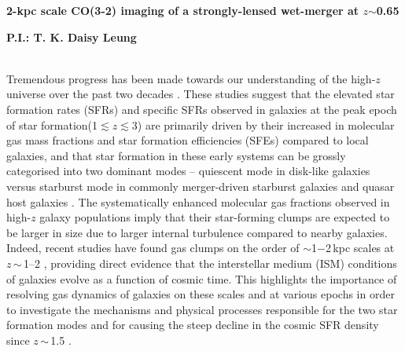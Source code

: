 \documentclass[11pt,a4paper,twoside,graphicx,color]{article}
\newcommand{\cco}{\mbox{CO(3-2)}\xspace}
\newcommand{\ssim}{\,$\sim$\,}
\newcommand{\SF}{star formation\xspace}
\newcommand{\galpop}{galaxy populations\xspace}
\newcommand{\SB}{starburst\xspace}
\newcommand{\highz}{high-$z$\xspace}
\begin{document}
%
%
\begin{center}{\LARGE \bf
2-kpc scale \cco imaging of a strongly-lensed wet-merger at $z$$\sim$0.65
}\end{center}
\centerline{\bf P.I.: T. K. Daisy Leung}
\vspace{0.5em}
 \\
\indent Tremendous progress has been made towards our understanding of the \highz
universe over the past two decades \citep[see recent reviews by][]{CW13,Madau14a, Casey14a}. These studies
suggest that the elevated \SF rates (SFRs) and specific SFRs observed in galaxies at
the peak epoch of \SF (1$\lesssim$$z$$\lesssim$3) are
primarily driven by their increased in molecular gas mass fractions and \SF efficiencies (SFEs) compared to
local galaxies, and that \SF in these early systems can be grossly categorised into
two dominant modes -- quiescent mode in disk-like galaxies versus starburst mode in commonly merger-driven
 \SB galaxies and quasar host galaxies \citep[e.g.][]{Sargent12a}. 
The systematically enhanced molecular gas fractions observed in \highz
\galpop imply that their star-forming clumps are expected to be larger in size due to 
larger internal turbulence
compared to nearby galaxies.  %
Indeed, recent studies have found gas clumps on the order of
$\sim$1$-$2\,kpc scales at $z$\ssim1--2 \citep[e.g.][]{Genzel11a, Swinbank12a, Swinbank12b}, 
providing direct evidence that the
interstellar medium (ISM) conditions of galaxies evolve as a function of cosmic time. This
highlights the importance of resolving gas dynamics of galaxies on these scales 
and at various epochs in order to investigate the
mechanisms and physical processes responsible for %
the two \SF modes and for causing the steep decline in the cosmic SFR density since $z$\ssim1.5 \citep[e.g.][]{Lagos11a,Popping12a}.
\end{document}
